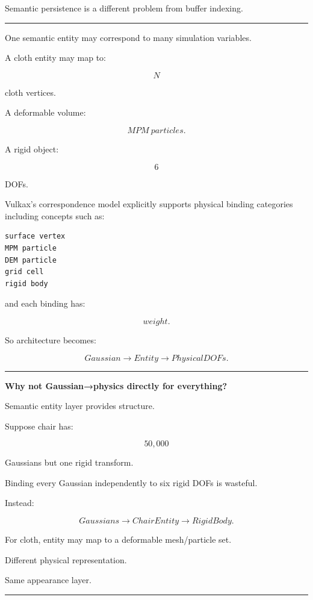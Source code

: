 Semantic persistence is a different problem from buffer indexing.

\begin{center}\rule{0.5\linewidth}{0.5pt}\end{center}

One semantic entity may correspond to many simulation variables.

A cloth entity may map to:

\[
N
\]

cloth vertices.

A deformable volume:

\[
MPM\ particles.
\]

A rigid object:

\[
6
\]

DOFs.

Vulkax's correspondence model explicitly supports physical binding categories including concepts such as:

\protect{}\label{ijumvh}%
\begin{verbatim}
surface vertex
MPM particle
DEM particle
grid cell
rigid body
\end{verbatim}

and each binding has:

\[
weight.
\]

So architecture becomes:

\[
Gaussian
\rightarrow
Entity
\rightarrow
PhysicalDOFs.
\]

\begin{center}\rule{0.5\linewidth}{0.5pt}\end{center}

\textbf{Why not Gaussian→physics directly for everything?}

Semantic entity layer provides structure.

Suppose chair has:

\[
50,000
\]

Gaussians but one rigid transform.

Binding every Gaussian independently to six rigid DOFs is wasteful.

Instead:

\[
Gaussians
\rightarrow
ChairEntity
\rightarrow
RigidBody.
\]

For cloth, entity may map to a deformable mesh/particle set.

Different physical representation.

Same appearance layer.

\begin{center}\rule{0.5\linewidth}{0.5pt}\end{center}

